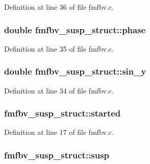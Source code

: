 Definition at line 36 of file fmfbv.\+c.

\subsubsection[{\texorpdfstring{phase}{phase}}]{\setlength{\rightskip}{0pt plus 5cm}double fmfbv\+\_\+susp\+\_\+struct\+::phase}\hypertarget{structfmfbv__susp__struct_af844358625a3c4d32e44a3ebdf71dee6}{}\label{structfmfbv__susp__struct_af844358625a3c4d32e44a3ebdf71dee6}


Definition at line 35 of file fmfbv.\+c.

\subsubsection[{\texorpdfstring{sin\+\_\+y}{sin_y}}]{\setlength{\rightskip}{0pt plus 5cm}double fmfbv\+\_\+susp\+\_\+struct\+::sin\+\_\+y}\hypertarget{structfmfbv__susp__struct_ae781e4bc475bf80ec415d94d83548a9d}{}\label{structfmfbv__susp__struct_ae781e4bc475bf80ec415d94d83548a9d}


Definition at line 34 of file fmfbv.\+c.

\subsubsection[{\texorpdfstring{started}{started}}]{ fmfbv\+\_\+susp\+\_\+struct\+::started}\hypertarget{structfmfbv__susp__struct_a42707442763d495e3cb626b33a064e27}{}\label{structfmfbv__susp__struct_a42707442763d495e3cb626b33a064e27}


Definition at line 17 of file fmfbv.\+c.

\subsubsection[{\texorpdfstring{susp}{susp}}]{ fmfbv\+\_\+susp\+\_\+struct\+::susp}\hypertarget{structfmfbv__susp__struct_adb3e7c3ecfda07368a19599534351c57}{}\label{structfmfbv__susp__struct_adb3e7c3ecfda07368a19599534351c57}


